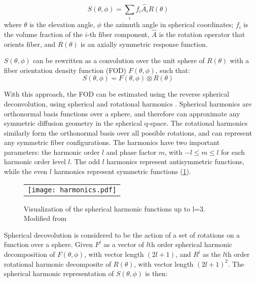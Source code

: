 \begin{equation}
S(\theta, \phi) = \sum_{i}^{} f_i \hat{A}_i R(\theta)
\end{equation}
where $\theta$ is the elevation angle,  $\phi$ the azimuth angle in spherical coordinates; $f_i$ is the volume fraction of the $i$-th fiber component, $\hat{A}$ is the rotation operator that orients fiber, and $R(\theta)$ is an axially symmetric response function. 

$S(\theta,\phi) $ can be rewritten as a convolution over the unit sphere of $R(\theta)$ with a fiber orientation density function (FOD) $F(\theta, \phi)$, such that:
\begin{equation}
S(\theta, \phi) = F(\theta, \phi) \otimes R(\theta)
\end{equation}

With this approach, the FOD can be estimated using the reverse spherical deconvolution, using spherical and rotational harmonics \cite{Healy1998}. Spherical harmonics are orthonormal basis functions over a sphere, and therefore can approximate any symmetric diffusion geometry in the spherical q-space. The rotational harmonics similarly form the orthonormal basis over all possible rotations, and can represent any symmetric fiber configurations. The harmonics have two important parameters: the harmonic order $l$ and phase factor $m$, with $ -l \leq m \leq l $ for each harmonic order level $l$. The odd $l$ harmonics represent antisymmetric functions, while the even $l$ harmonics represent symmetric functions (\ref{fig:harmonics}). 

\begin{figure}[ht]
\begin{center}
\begin{tabular}{c}
\texttt{[image: harmonics.pdf]}
\end{tabular}
\caption{Visualization of the spherical harmonic functions up to l=3. Modified from \protect\cite{sh-image-wikipedia}}
\label{fig:harmonics}
\end{center}
\end{figure}

Spherical decovolution is considered to be the action of a set of rotations on a function over a sphere. Given $F^l $ as a vector of $l$th order spherical harmonic decomposition of  $F(\theta,\phi)$, with vector length $(2l + 1)$, and $R^l$ as the $l$th order rotational harmonic decomposite of $R(\theta)$, with vector length $(2l+1)^2$. The spherical harmonic representation of $S(\theta,\phi)$ is then:

